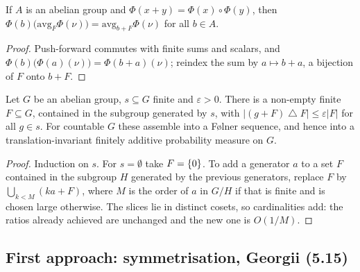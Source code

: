 \begin{lemma}
    \label{lem:sym-map-trans-average}
    \leanok

    If $A$ is an abelian group and $\Phi(x + y) = \Phi(x) \circ \Phi(y)$, then
    $\Phi(b)\bigl(\mathrm{avg}_F \Phi(\nu)\bigr) = \mathrm{avg}_{b + F} \Phi(\nu)$ for all
    $b \in A$.
\end{lemma}
\begin{proof}
    \leanok

    Push-forward commutes with finite sums and scalars, and
    $\Phi(b)\bigl(\Phi(a)(\nu)\bigr) = \Phi(b+a)(\nu)$; reindex the sum by $a \mapsto b + a$, a
    bijection of $F$ onto $b + F$.
\end{proof}

\begin{theorem}
    \label{thm:sym-foelner}
    \leanok

    Let $G$ be an abelian group, $s \subseteq G$ finite and $\varepsilon > 0$. There is a
    non-empty finite $F \subseteq G$, contained in the subgroup generated by $s$, with
    $|(g + F) \mathbin{\triangle} F| \le \varepsilon |F|$ for all $g \in s$. For countable $G$
    these assemble into a F\o lner sequence, and hence into a translation-invariant finitely
    additive probability measure on $G$.
\end{theorem}
\begin{proof}
    \leanok

    Induction on $s$. For $s = \emptyset$ take $F = \left\{ 0 \right\}$. To add a generator $a$ to a set $F$
    contained in the subgroup $H$ generated by the previous generators, replace $F$ by
    $\bigcup_{k < M} (k a + F)$, where $M$ is the order of $a$ in $G/H$ if that is finite and is
    chosen large otherwise. The slices lie in distinct cosets, so cardinalities add: the ratios
    already achieved are unchanged and the new one is $O(1/M)$.
\end{proof}

\subsection*{First approach: symmetrisation, Georgii (5.15)}

